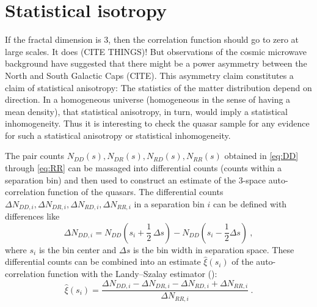 \documentclass[modern]{aastex631}
\begin{document}
\section{Statistical isotropy}\label{sec:stat}\noindent
If the fractal dimension is 3, then the correlation function should go to zero at large scales.
It does (CITE THINGS)!
But observations of the cosmic microwave background have suggested that there might be a power asymmetry between the North and South Galactic Caps (CITE).
This asymmetry claim constitutes a claim of statistical anisotropy:
The statistics of the matter distribution depend on direction.
In a homogeneous universe (homogeneous in the sense of having a mean density), that statistical anisotropy, in turn, would imply a statistical inhomogeneity.
Thus it is interesting to check the quasar sample for any evidence for such a statistical anisotropy or statistical inhomogeneity.

The pair counts $N_{DD}(s), N_{DR}(s), N_{RD}(s), N_{RR}(s)$ obtained in \eqref{eq:DD} through \eqref{eq:RR} can be massaged into differential counts (counts within a separation bin) and then used to construct an estimate of the 3-space auto-correlation function of the quasars.
The differential counts $\Delta N_{DD,i}, \Delta N_{DR,i}, \Delta N_{RD, i}, \Delta N_{RR, i}$ in a separation bin $i$ can be defined with differences like
\begin{equation}
    \Delta N_{DD,i} = N_{DD}(s_i+\frac{1}{2}\,\Delta s) - N_{DD}(s_i-\frac{1}{2}\Delta s) ~,
\end{equation}
where $s_i$ is the bin center and $\Delta s$ is the bin width in separation space.
These differential counts can be combined into an estimate $\hat\xi(s_i)$ of the auto-correlation function with the Landy--Szalay estimator (\citealt{ls}):
\begin{equation}\label{eq:ls}
    \hat\xi(s_i) = \frac{\Delta N_{DD,i} - \Delta N_{DR,i} - \Delta N_{RD,i} + \Delta N_{RR,i}}{\Delta N_{RR,i}} ~.
\end{equation}
\end{document}
